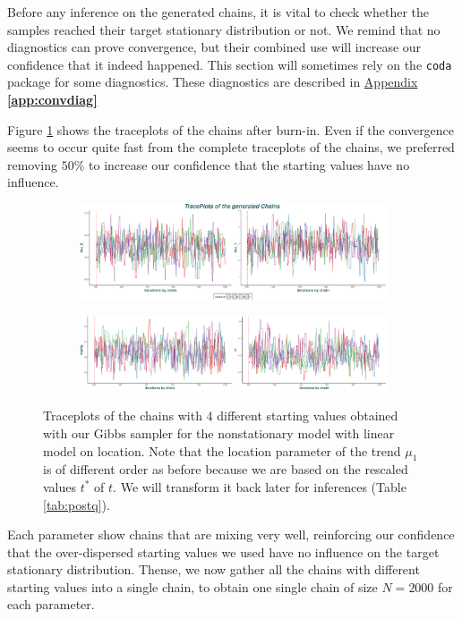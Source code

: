 Before any inference on the generated chains, it is vital to check whether the samples reached their target stationary distribution or not.
We remind that no diagnostics can prove convergence, but their combined use will increase our confidence that it indeed happened.
This section will sometimes rely on the \texttt{coda} package for some diagnostics. These diagnostics are described in \hyperref[app:convdiag]{Appendix \textbf{\ref{app:convdiag}}}

 Figure \ref{fig:mixchains} shows the traceplots of the chains after burn-in. Even if the convergence seems to occur quite fast from the complete traceplots of the chains, we preferred removing $50\%$ to increase our confidence that the starting values have no influence.
\begin{figure}
	\centering
	\begin{subfigure}[b]{0.99\textwidth}
		\includegraphics[width=1\linewidth]{chains1.pdf}
	\end{subfigure}
	
	\begin{subfigure}[b]{0.99\textwidth}
		\includegraphics[width=1\linewidth]{chains2.pdf}
	\end{subfigure}
	\caption{Traceplots of the chains with $4$ different starting values obtained with our Gibbs sampler for the nonstationary model with linear model on location. Note that the location parameter of the trend $\mu_1$ is of different order as before because we are based on the rescaled values $t^*$ of $t$. We will transform it back  later for inferences (Table \ref{tab:postq}). }\label{fig:mixchains}
\end{figure}
Each parameter show chains that are mixing very well, reinforcing our confidence that the over-dispersed starting values we used have no influence on the target stationary distribution. 
Thense, we now gather all the chains with different starting values into a single chain, to obtain one single chain of size $N=2000$ for each parameter.



